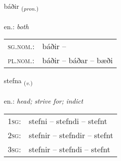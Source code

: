 \documentclass[frontgrid, backgrid]{flacards}\usepackage[]{graphicx}\usepackage[]{xcolor}
\begin{document}
\renewcommand{\flhead}{\vskip5pt \fboxsep=0pt {\small\bfseries\footnotesize Fornafn | Pronoun}}
\renewcommand{\fcfoot}{\vskip5pt \fboxsep=0pt \hspace{2pt}{\small\bfseries\footnotesize 1K}}

\renewcommand{\blhead}{\vskip5pt {\small\bfseries\footnotesize Fornafn | Pronoun }}
\renewcommand{\bcfoot}{\vskip5pt \hspace{2pt}{\small\bfseries\footnotesize 1K}}


{báðir \small{\textsubscript{(\textit{pron.})}} \\[1ex] %
\textphonetic{[pauːðɪr]} \\
en.: \emph{both} \\  [2ex]
\renewcommand*{\arraystretch}{0.8}
\begin{tabular}{ll}
\textsc{sg.nom.}: & báðir  -- \\ 
\textsc{pl.nom.}: & báðir -- báðar -- bæði
\end{tabular}
}

\renewcommand{\flhead}{\vskip5pt \fboxsep=0pt {\small\bfseries\footnotesize Sagnorð | Verb}}
\renewcommand{\fcfoot}{\vskip5pt \fboxsep=0pt \hspace{2pt}{\small\bfseries\footnotesize 1K}}

\renewcommand{\blhead}{\vskip5pt {\small\bfseries\footnotesize Sagnorð | Verb }}
\renewcommand{\bcfoot}{\vskip5pt \hspace{2pt}{\small\bfseries\footnotesize 1K}}


{stefna \small{\textsubscript{(\textit{v.})}} \\[1ex] %
\textphonetic{[stɛpna]} \\
en.: \emph{head; strive for; indict} \\  [2ex]
\renewcommand*{\arraystretch}{0.8}
\begin{tabular}{p{1cm}l}
\textsc{1sg}: & stefni -- stefndi -- stefnt \\ 
\textsc{2sg}: & stefnir -- stefndir -- stefnt \\ 
\textsc{3sg}: & stefnir -- stefndi -- stefnt \\ 
\end{tabular}
}
\end{document}
